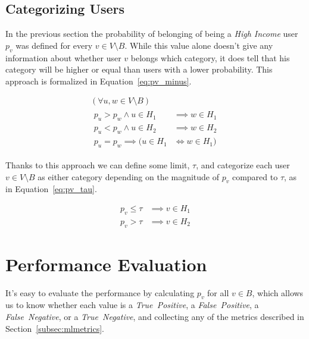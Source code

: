 \subsection{Categorizing Users}

In the previous section the probability of belonging of being a \emph{High Income} user $p_v$ was defined for every $v \in V \setminus B$. While this value alone doesn't give any information about whether user $v$ belongs which category, it does tell that his category will be higher or equal than users with a lower probability. This approach is formalized in Equation~\ref{eq:pv_minus}.

\begin{equation}
\label{eq:pv_minus}
\begin{gathered}
	\left( \forall u, w \in V \setminus B \right) \\
	\begin{aligned}
		p_u > p_w \land u \in H_1 &\implies w \in H_1 \\
		p_u < p_w \land u \in H_2 &\implies w \in H_2 \\
		p_u = p_w \implies ( u \in H_1 &\iff w \in H_1 )
	\end{aligned}
\end{gathered}
\end{equation}

Thanks to this approach we can define some limit, $\tau$, and categorize each user $v \in V \setminus B$ as either category depending on the magnitude of $p_v$ compared to $\tau$, as in Equation~\ref{eq:pv_tau}.

\begin{equation}
\label{eq:pv_tau}
\begin{aligned}
p_v \leq \tau &\implies v \in H_1 \\
p_v > \tau &\implies v \in H_2
\end{aligned}
\end{equation}

\section{Performance Evaluation}
\label{subsec:performance_evaluation}

It's easy to evaluate the performance by calculating $p_v$ for all $v \in B$, which allows us to know whether each value is a \emph{True~Positive}, a \emph{False~Positive}, a \emph{False~Negative}, or a \emph{True~Negative}, and collecting any of the metrics described in Section~\ref{subsec:mlmetrics}.

